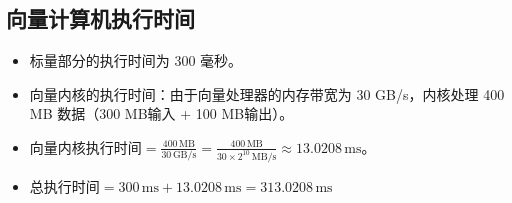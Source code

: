 \documentclass{article}
\begin{document}
\subsection*{向量计算机执行时间}
\begin{itemize}
    \item 标量部分的执行时间为 300 毫秒。
    \item 向量内核的执行时间：由于向量处理器的内存带宽为 30 GB/s，内核处理 400 MB 数据（300 MB输入 + 100 MB输出）。
    \item $ \textit{向量内核执行时间} = \frac{400 \,\text{MB}}{30 \,\text{GB/s}} = \frac{400 \,\text{MB}}{30\times 2^{10} \,\text{MB/s}} \approx13.0208\,\text{ms}$。
    \item $ \textit{总执行时间} = 300 \,\text{ms} + 13.0208 \,\text{ms}= 313.0208 \,\text{ms}$
\end{itemize}
\end{document}
